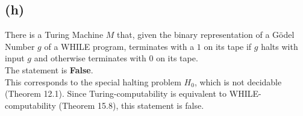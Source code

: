 \subsection{(h)}
There is a Turing Machine $M$ that, given the binary representation of a Gödel Number $g$ of a \textsc{WHILE} program, terminates with a $1$ on its tape if $g$ halts with input $g$ and otherwise terminates with $0$ on its tape.\vspace{0.3cm}\\
The statement is \textbf{False}.\\
This corresponds to the special halting problem $H_{0}$, which is not decidable (Theorem 12.1). Since Turing-computability is equivalent to \textsc{WHILE}-computability (Theorem 15.8), this statement is false.



